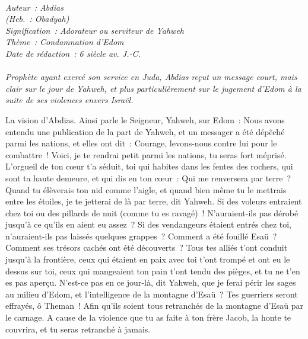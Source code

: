 \BFont
\noindent\hrulefill
{\footnotesize
\textit{
\bigskip
{\centering{}
\\Auteur~: Abdias
\\(Heb.~: Obadyah)
\\Signification~: Adorateur ou serviteur de Yahweh
\\Thème~: Condamnation d'Edom
\\Date de rédaction~: 6 siècle av. J.-C.\\}
}
\textit{
\\Prophète ayant exercé son service en Juda, Abdias reçut un message court, mais clair sur le jour de Yahweh, et plus particulièrement sur le jugement d'Edom à la suite de ses violences envers Israël.\bigskip
}
}
\par\nobreak\noindent\hrulefill
\begin{multicols}{2}
\VerseOne{}La vision d'Abdias. Ainsi parle le Seigneur, Yahweh, sur Edom~: Nous avons entendu une publication de la part de Yahweh, et un messager a été dépêché parmi les nations, et elles ont dit~: Courage, levons-nous contre lui pour le combattre~!
Voici, je te rendrai petit parmi les nations, tu seras fort méprisé.
L'orgueil de ton cœur t'a séduit, toi qui habites dans les fentes des rochers, qui sont ta haute demeure, et qui dis en ton cœur~: Qui me renversera par terre~?
Quand tu élèverais ton nid comme l'aigle, et quand bien même tu le mettrais entre les étoiles, je te jetterai de là par terre, dit Yahweh.
Si des voleurs entraient chez toi ou des pillards de nuit (comme tu es ravagé)~! N'auraient-ils pas dérobé jusqu'à ce qu'ils en aient eu assez~? Si des vendangeurs étaient entrés chez toi, n'auraient-ils pas laissés quelques grappes~?
Comment a été fouillé Esaü~? Comment ses trésors cachés ont été découverts~?
Tous tes alliés t'ont conduit jusqu'à la frontière, ceux qui étaient en paix avec toi t'ont trompé et ont eu le dessus sur toi, ceux qui mangeaient ton pain t'ont tendu des pièges, et tu ne t'en es pas aperçu.
N'est-ce pas en ce jour-là, dit Yahweh, que je ferai périr les sages au milieu d'Edom, et l'intelligence de la montagne d'Esaü~?
Tes guerriers seront effrayés, ô Theman~! Afin qu'ils soient tous retranchés de la montagne d'Esaü par le carnage.
A cause de la violence que tu as faite à ton frère Jacob, la honte te couvrira, et tu seras retranché à jamais.

\end{multicols}
